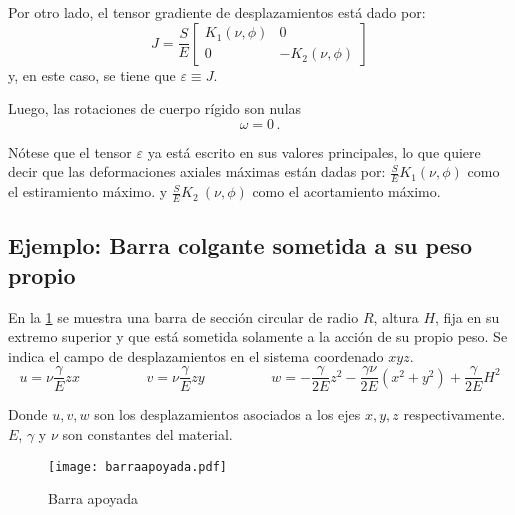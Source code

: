 \documentclass[../notas medios.tex]{subfiles}
\begin{document}
Por otro lado, el tensor gradiente de desplazamientos está dado por: 
\[J = \frac{S}{E}\left[ {\begin{array}{*{20}{c}}
{{K_1}\left( {\nu ,\phi } \right)}&0\\
0&{ - {K_2}\left( {\nu ,\phi } \right)}
\end{array}} \right]\]
y, en este caso, se tiene que \(\varepsilon  \equiv J\).

Luego, las rotaciones de cuerpo rígido son nulas
\[\omega  = 0\, .\]

Nótese que el tensor $\varepsilon $ ya está escrito en sus valores principales, lo que quiere decir que las deformaciones axiales máximas están dadas por: $\frac{S}{E}{K_1}\left( {\nu ,\phi }\right) $ como el estiramiento máximo. y $ \frac{S}{E} {K_2}\ \left({\nu ,\phi } \right)$  como el acortamiento máximo.

\subsection{Ejemplo: Barra colgante sometida a su peso propio}

En la  \cref{BarApo} se muestra una barra de sección circular de radio $R$, 
altura $H$, fija en su extremo superior y que está sometida solamente a la 
acción de su propio peso. Se indica el campo de desplazamientos en el sistema 
coordenado $xyz$.
\begin{equation*}	
	u= \nu \dfrac{\gamma}{E} z x 
	\hspace{2cm}
	v= \nu \dfrac{\gamma}{E} z y 
	\hspace{2cm}
	w= -\dfrac{\gamma}{2E} z^2 - \dfrac{\gamma \nu}{2E} (x^2+y^2)+\dfrac{\gamma}{2E} H^2  
\end{equation*}

Donde 	$u,v,w$ son los desplazamientos asociados a los ejes $x,y,z$ respectivamente. $E$, $\gamma$ y $\nu$ son constantes del material. \\ 		\begin{figure}[h]
	\centering
	\texttt{[image: barraapoyada.pdf]}
	\caption{Barra apoyada}
	 \label{BarApo}
\end{figure}\\
\end{document}

